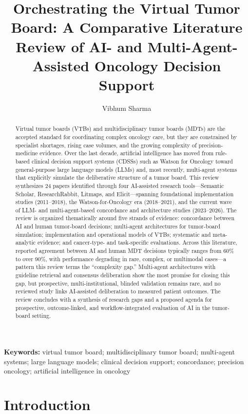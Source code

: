 \documentclass{article}
\title{Orchestrating the Virtual Tumor Board: A Comparative Literature Review of AI- and Multi-Agent-Assisted Oncology Decision Support}
\author{Vibhum Sharma}
\date{}
\begin{document}
\maketitle

\begin{abstract}
Virtual tumor boards (VTBs) and multidisciplinary tumor boards (MDTs) are the accepted standard for coordinating complex oncology care, but they are constrained by specialist shortages, rising case volumes, and the growing complexity of precision-medicine evidence. Over the last decade, artificial intelligence has moved from rule-based clinical decision support systems (CDSSs) such as Watson for Oncology toward general-purpose large language models (LLMs) and, most recently, multi-agent systems that explicitly simulate the deliberative structure of a tumor board. This review synthesizes 24 papers identified through four AI-assisted research tools---Semantic Scholar, ResearchRabbit, Litmaps, and Elicit---spanning foundational implementation studies (2011--2018), the Watson-for-Oncology era (2018--2021), and the current wave of LLM- and multi-agent-based concordance and architecture studies (2023--2026). The review is organized thematically around five strands of evidence: concordance between AI and human tumor-board decisions; multi-agent architectures for tumor-board simulation; implementation and operational models of VTBs; systematic and meta-analytic evidence; and cancer-type- and task-specific evaluations. Across this literature, reported agreement between AI and human MDT decisions typically ranges from 60\% to over 90\%, with performance degrading in rare, complex, or multimodal cases---a pattern this review terms the ``complexity gap.'' Multi-agent architectures with guideline retrieval and consensus deliberation show the most promise for closing this gap, but prospective, multi-institutional, blinded validation remains rare, and no reviewed study links AI-assisted deliberation to measured patient outcomes. The review concludes with a synthesis of research gaps and a proposed agenda for prospective, outcome-linked, and workflow-integrated evaluation of AI in the tumor-board setting.
\end{abstract}

\noindent\textbf{Keywords:} virtual tumor board; multidisciplinary tumor board; multi-agent systems; large language models; clinical decision support; concordance; precision oncology; artificial intelligence in oncology

\section{Introduction}
\label{sec:introduction}
\end{document}
